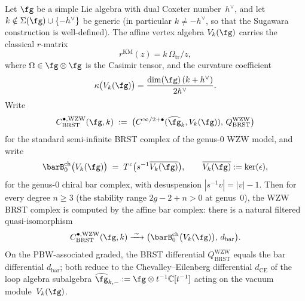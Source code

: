 \begin{proposition}
\label{prop:wzw-brst-bar-genus0}
Let $\fg$ be a simple Lie algebra with dual Coxeter number~$h^\vee$,
and let $k \notin \Sigma(\fg) \cup \{-h^\vee\}$ be generic
\textup{(}in particular $k \neq -h^\vee$, so that the Sugawara
construction is well-defined\textup{)}. The affine vertex algebra
$V_k(\fg)$ carries the classical $r$-matrix
\begin{equation}\label{eq:wzw-r-matrix-brst}
r^{\mathrm{KM}}(z) = k\,\Omega_{\mathrm{tr}}/z,
\end{equation}
where $\Omega \in \fg \otimes \fg$ is the Casimir tensor, and the
curvature coefficient
\begin{equation}\label{eq:wzw-kappa-brst}
\kappa\bigl(V_k(\fg)\bigr)
= \frac{\dim(\fg)\,(k + h^\vee)}{2h^\vee}.
\end{equation}
Write
\[
 C_{\mathrm{BRST}}^{\bullet,\mathrm{WZW}}(\fg,k)
 \;:=\;
 \bigl(
 C^{\infty/2+\bullet}(\widehat{\fg}_k, V_k(\fg)),\,
 Q_{\mathrm{BRST}}^{\mathrm{WZW}}
 \bigr)
\]
for the standard semi-infinite BRST complex of the genus-$0$ WZW
model, and write
\[
 \barB^{\mathrm{ch}}_0\bigl(V_k(\fg)\bigr)
 \;=\;
 T^c\bigl(s^{-1}\overline{V_k(\fg)}\bigr),
 \qquad
 \overline{V_k(\fg)} := \ker(\epsilon),
\]
for the genus-$0$ chiral bar complex, with desuspension
$|s^{-1}v| = |v| - 1$. Then for every degree $n \geq 3$
\textup{(}the stability range $2g - 2 + n > 0$ at genus~$0$\textup{)},
the WZW BRST complex is computed by the affine bar complex: there
is a natural filtered quasi-isomorphism
\begin{equation}\label{eq:wzw-brst-bar-qi}
 C_{\mathrm{BRST}}^{\bullet,\mathrm{WZW}}(\fg,k)
 \xrightarrow{\;\sim\;}
 \bigl(
 \barB^{\mathrm{ch}}_0\bigl(V_k(\fg)\bigr),\,
 d_{\mathrm{bar}}
 \bigr).
\end{equation}
On the PBW-associated graded, the BRST differential
$Q_{\mathrm{BRST}}^{\mathrm{WZW}}$ equals the bar differential
$d_{\mathrm{bar}}$; both reduce to the Chevalley--Eilenberg
differential $d_{\mathrm{CE}}$ of the loop algebra subalgebra
$\widehat{\fg}_{k,-} := \fg \otimes t^{-1}\mathbb{C}[t^{-1}]$
acting on the vacuum module~$V_k(\fg)$.
\end{proposition}

